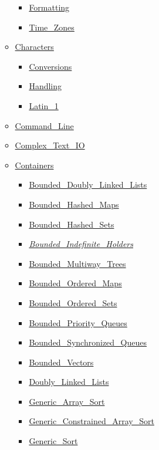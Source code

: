 \begin{multicols*}{\columnnr}
\begin{scriptsize}
\begin{itemize}[leftmargin=0mm]
\begin{itemize}[leftmargin=5mm]
\begin{itemize}[leftmargin=5mm]
	\item[] \href{\adarmlink{RM-9-6-1.html}}{Formatting}
	\item[] \href{\adarmlink{RM-9-6-1.html}}{Time\_Zones}
	\end{itemize}
  \item[] \href{\adarmlink{RM-A-3-1.html}}{Characters}
	\begin{itemize}[leftmargin=5mm]
	\item[] \href{\adarmlink{RM-A-3-4.html}}{Conversions}
	\item[] \href{\adarmlink{RM-A-3-2.html}}{Handling}
	\item[] \href{\adarmlink{RM-A-3-3.html}}{Latin\_1}
	\end{itemize}
  \item[] \href{\adarmlink{RM-A-15.html}}{Command\_Line}
  \item[] \href{\adarmlink{RM-G-1-3.html}}{Complex\_Text\_IO}
  \item[] \href{\adarmlink{RM-A-18-1.html}}{Containers}
	\begin{itemize}[leftmargin=5mm]
	\item[] \href{\adarmlink{RM-A-18-20.html}}{Bounded\_Doubly\_Linked\_Lists}
	\item[] \href{\adarmlink{RM-A-18-21.html}}{Bounded\_Hashed\_Maps}
	\item[] \href{\adarmlink{RM-A-18-23.html}}{Bounded\_Hashed\_Sets}
	\item[] \href{\adarmlink{RM-A-18-32.html}}{\textit{Bounded\_Indefinite\_Holders}}
	\item[] \href{\adarmlink{RM-A-18-25.html}}{Bounded\_Multiway\_Trees}
	\item[] \href{\adarmlink{RM-A-18-22.html}}{Bounded\_Ordered\_Maps}
	\item[] \href{\adarmlink{RM-A-18-24.html}}{Bounded\_Ordered\_Sets}
	\item[] \href{\adarmlink{RM-A-18-31.html}}{Bounded\_Priority\_Queues}
	\item[] \href{\adarmlink{RM-A-18-29.html}}{Bounded\_Synchronized\_Queues}
	\item[] \href{\adarmlink{RM-A-18-19.html}}{Bounded\_Vectors}
	\item[] \href{\adarmlink{RM-A-18-3.html}}{Doubly\_Linked\_Lists}
	\item[] \href{\adarmlink{RM-A-18-26.html}}{Generic\_Array\_Sort}
	\item[] \href{\adarmlink{RM-A-18-26.html}}{Generic\_Constrained\_Array\_Sort}
	\item[] \href{\adarmlink{RM-A-18-26.html}}{Generic\_Sort}

\end{itemize}
\end{itemize}
\end{itemize}
\end{scriptsize}
\end{multicols*}
